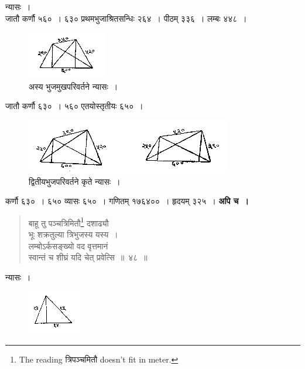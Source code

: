 \documentclass[11pt, openany]{book}
\begin{document}
 न्यासः~। \\

\vspace{-4mm}
 जातौ कर्णौ ५६०~। ६३० प्रथमभुजाश्रितसन्धिः २६४~। पीठम्
३३६~। लम्बः ४४८~। 

\begin{figure}[h!]
    \centering
   \captionsetup{labelformat=empty}
  \caption{अस्य भुजमुखपरिवर्तने न्यासः~।}
\vspace{-2mm}
    \includegraphics[scale=0.85]{graphics/capture59.png}
\end{figure}
\vspace{-2mm}

 जातौ कर्णौ ६३०~। ५६० एतयोस्तृतीयः ६५०~। 
 
\begin{figure}[h!]
    \centering
   \captionsetup{labelformat=empty}
  \caption{द्वितीयभुजपरिवर्तने कृते न्यासः~।}
\vspace{-2mm}
    \includegraphics[scale=0.85]{graphics/capture60.png}
\end{figure}
\vspace{-2mm}

 कर्णौ ६३०~। ६५० व्यासः ६५०~। गणितम् १७६४००~। हृदयम् ३२५~। 
\newpage
 \textbf{अपि च~।} 
\begin{quote}
    \bqt 
     बाहू तु पञ्चत्रिमितौ\footnote{The reading त्रिपञ्चमितौ doesn't fit in meter.} दशाढ्यौ \\
     भूः शक्रतुल्या त्रिभुजस्य यस्य~।\\
लम्बोऽर्कसङ्ख्यो वद वृत्तमानं \\
स्वान्तं च शीघ्रं यदि चेत् प्रवेत्सि~॥~४८~॥
\end{quote}

 न्यासः~। 
\vspace{-2mm}

\begin{figure}[h!]
    \centering
    \includegraphics[scale=0.85]{graphics/capture61.png}
\end{figure}
\vspace{-2mm}
\end{document}
